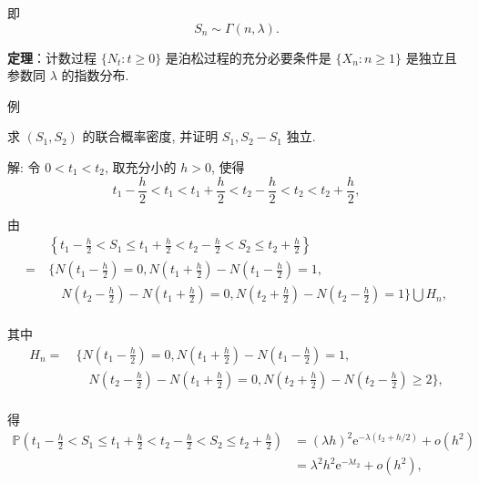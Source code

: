 \documentclass[openany]{ctexbook}
\theoremstyle{kaiti}
\theoremstyle{normal}
\begin{document}
  即
\begin{equation}
    S_n\sim\Gamma(n,\lambda).
\end{equation}
  
  \textbf{定理}：计数过程 $\{N_t:t\geqslant0\}$ 是泊松过程的充分必要条件是 $\{X_n:n\geqslant1\}$ 是独立且参数同 $\lambda$ 的指数分布.
  
  例
  
  求 $(S_1,S_2)$ 的联合概率密度, 并证明 $S_1,S_2-S_1$ 独立.
  
  解: 令 $0< t_1 < t_2$, 取充分小的 $h>0$, 使得
\begin{equation}
    t_1-\frac{h}{2}< t_1 < t_1+\frac{h}{2} < t_2-\frac{h}{2} < t_2 < t_2+\frac{h}{2},
\end{equation}
  
  由
\begin{equation}
    \begin{aligned}
      &~\left\{t_1-\frac{h}{2}< S_1 \leqslant t_1+\frac{h}{2} < t_2-\frac{h}{2} < S_2 \leqslant t_2+\frac{h}{2}\right\}\\
      =&~\bigg\{N\left(t_1-\frac{h}{2}\right)=0,N\left(t_1+\frac{h}{2}\right)-N\left(t_1-\frac{h}{2}\right)=1,\\
      &\quad~N\left(t_2-\frac{h}{2}\right)-N\left(t_1+\frac{h}{2}\right)=0,N\left(t_2+\frac{h}{2}\right)-N\left(t_2-\frac{h}{2}\right)=1\bigg\}\bigcup H_n,\\
    \end{aligned}
\end{equation}
  
  其中
\begin{equation}
    \begin{aligned}
      H_n=&~\bigg\{N\left(t_1-\frac{h}{2}\right)=0,N\left(t_1+\frac{h}{2}\right)-N\left(t_1-\frac{h}{2}\right)=1,\\
      &\quad~N\left(t_2-\frac{h}{2}\right)-N\left(t_1+\frac{h}{2}\right)=0,N\left(t_2+\frac{h}{2}\right)-N\left(t_2-\frac{h}{2}\right)\geqslant2\bigg\},\\
    \end{aligned}
\end{equation}
  
  得
\begin{equation}
    \begin{aligned}
      \mathbb{P}\left(t_1-\frac{h}{2}< S_1 \leqslant t_1 + \frac{h}{2} < t_2-\frac{h}{2} < S_2 \leqslant t_2 + \frac{h}{2}\right)
      &=(\lambda h)^2\mathrm{e}^{-\lambda(t_2+h/2)}+o(h^2)\\
      &=\lambda^2h^2\mathrm{e}^{-\lambda t_2}+o(h^2),\\
    \end{aligned}
\end{equation}
  
\end{document}
